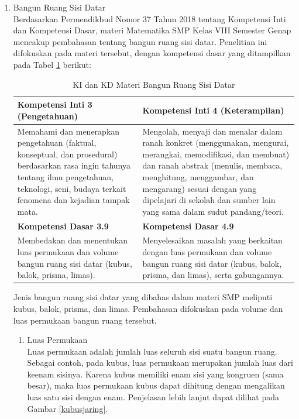\documentclass[12pt]{article}
\begin{document}
\begin{enumerate}
    \item Bangun Ruang Sisi Datar\\
    \hspace*{1cm}Berdasarkan Permendikbud Nomor 37 Tahun 2018 tentang Kompetensi Inti dan Kompetensi Dasar, materi Matematika SMP Kelas VIII Semester Genap mencakup pembahasan tentang bangun ruang sisi datar. Penelitian ini difokuskan pada materi tersebut, dengan kompetensi dasar yang ditampilkan pada Tabel \ref{kikd} berikut:
    \begin{table}[H]
        \centering
        \caption{KI dan KD Materi Bangun Ruang Sisi Datar}
        \label{kikd}
        \begin{tabular}{|p{7cm}|p{7cm}|}
            \hline
            \textbf{Kompetensi Inti 3 (Pengetahuan)} & \textbf{Kompetensi Inti 4 (Keterampilan)} \\
            \hline
            Memahami dan menerapkan pengetahuan (faktual, konseptual, dan prosedural) berdasarkan rasa ingin tahunya tentang ilmu pengetahuan, teknologi, seni, budaya terkait fenomena dan kejadian tampak mata. &
            Mengolah, menyaji dan menalar dalam ranah konkret (menggunakan, mengurai, merangkai, memodifikasi, dan membuat) dan ranah abstrak (menulis, membaca, menghitung, menggambar, dan mengarang) sesuai dengan yang dipelajari di sekolah dan sumber lain yang sama dalam sudut pandang/teori. \\
            \hline
            \textbf{Kompetensi Dasar 3.9} & \textbf{Kompetensi Dasar 4.9}\\
            \hline
            Membedakan dan menentukan luas permukaan dan volume bangun ruang sisi datar (kubus, balok, prisma, limas). & Menyelesaikan masalah yang berkaitan dengan luas permukaan dan volume bangun ruang sisi datar (kubus, balok, prisma, dan limas), serta gabungannya.\\
            \hline
        \end{tabular}
    \end{table}
    \hspace*{1cm}Jenis bangun ruang sisi datar yang dibahas dalam materi SMP meliputi kubus, balok, prisma, dan limas. Pembahasan difokuskan pada volume dan luas permukaan bangun ruang tersebut.
    \begin{enumerate}
        \item Luas Permukaan\\
        \hspace*{1cm}Luas permukaan adalah jumlah luas seluruh sisi suatu bangun ruang. Sebagai contoh, pada kubus, luas permukaan merupakan jumlah luas dari keenam sisinya. Karena kubus memiliki enam sisi yang kongruen (sama besar), maka luas permukaan kubus dapat dihitung dengan mengalikan luas satu sisi dengan enam. Penjelasan lebih lanjut dapat dilihat pada Gambar \ref{kubusjaring}.

\end{enumerate}
\end{enumerate}
\end{document}
